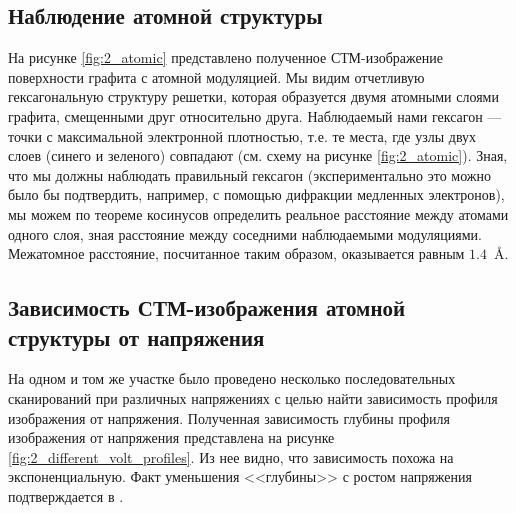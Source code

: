 \documentclass[a4paper, 12pt]{article}
\begin{document}
\subsection{Наблюдение атомной структуры}

На рисунке \ref{fig:2_atomic} представлено полученное СТМ-изображение поверхности графита с атомной модуляцией. Мы видим отчетливую гексагональную структуру решетки, которая образуется двумя атомными слоями графита, смещенными друг относительно друга. Наблюдаемый нами гексагон --- точки с максимальной электронной плотностью, т.е. те места, где узлы двух слоев (синего и зеленого) совпадают (см. схему на рисунке \ref{fig:2_atomic}). Зная, что мы должны наблюдать правильный гексагон (экспериментально это можно было бы подтвердить, например, с помощью дифракции медленных электронов), мы можем по теореме косинусов определить реальное расстояние между атомами одного слоя, зная расстояние между соседними наблюдаемыми модуляциями. Межатомное расстояние, посчитанное таким образом, оказывается равным $1.4$~\AA. 

\subsection{Зависимость СТМ-изображения атомной структуры от напряжения}

На одном и том же участке было проведено несколько последовательных сканирований при различных напряжениях с целью найти зависимость профиля изображения от напряжения. Полученная зависимость глубины профиля изображения от напряжения представлена на рисунке \ref{fig:2_different_volt_profiles}. Из нее видно, что зависимость похожа на экспоненциальную. Факт уменьшения <<глубины>> с ростом напряжения подтверждается в \cite{STM_Binnig}.

\end{document}
